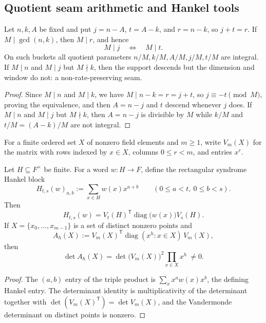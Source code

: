 \subsection{Quotient seam arithmetic and Hankel tools}

\begin{lemma}\label{lem:v13-gap2}
Let $n,k,A$ be fixed and put $j=n-A$, $t=A-k$, and $r=n-k$, so $j+t=r$.  If $M\mid\gcd(n,k)$, then $M\mid r$, and hence
\[
        M\mid j \quad\Longleftrightarrow\quad M\mid t.
\]
On such buckets all quotient parameters $n/M,k/M,A/M,j/M,t/M$ are integral.  If $M\mid n$ and $M\mid j$ but $M\nmid k$, then the support descends but the dimension and window do not: a non-rate-preserving seam.
\end{lemma}

\begin{proof}
Since $M\mid n$ and $M\mid k$, we have $M\mid n-k=r=j+t$, so $j\equiv-t\pmod M$, proving the equivalence, and then $A=n-j$ and $t$ descend whenever $j$ does.  If $M\mid n$ and $M\mid j$ but $M\nmid k$, then $A=n-j$ is divisible by $M$ while $k/M$ and $t/M=(A-k)/M$ are not integral.
\end{proof}

For a finite ordered set $X$ of nonzero field elements and $m\ge1$, write $V_m(X)$ for the matrix with rows indexed by $x\in X$, columns $0\le r<m$, and entries $x^r$.

\begin{proposition}\label{prop:v13-hankel}
Let $H\subseteq F^\times$ be finite.  For a word $w:H\to F$, define the rectangular syndrome Hankel block
\[
        H_{t,s}(w)_{a,b}:=\sum_{x\in H}w(x)x^{a+b}
        \qquad(0\le a<t,\ 0\le b<s).
\]
Then
\[
        H_{t,s}(w)=V_t(H)^{\mathsf T}\operatorname{diag}\bigl(w(x)\bigr)V_s(H).
\]
If $X=\{x_0,\ldots,x_{m-1}\}$ is a set of distinct nonzero points and
\[
        A_h(X):=V_m(X)^{\mathsf T}\operatorname{diag}(x^h:x\in X)\,V_m(X),
\]
then
\[
        \det A_h(X)=\det\bigl(V_m(X)\bigr)^2\prod_{x\in X}x^h\ \ne0 .
\]
\end{proposition}

\begin{proof}
The $(a,b)$ entry of the triple product is $\sum_{x}x^aw(x)x^b$, the defining Hankel entry.  The determinant identity is multiplicativity of the determinant together with $\det(V_m(X)^{\mathsf T})=\det V_m(X)$, and the Vandermonde determinant on distinct points is nonzero.
\end{proof}

